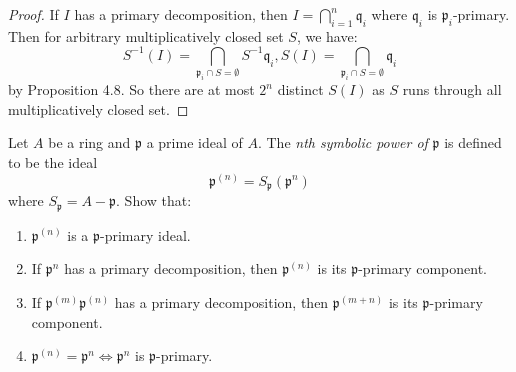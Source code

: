 \documentclass{solution}
\begin{document}
\begin{proof}
    If $I$ has a primary decomposition, then $I = \bigcap\limits_{i = 1}^{n} \mathfrak{q}_i$ where $\mathfrak{q}_i$ is $\mathfrak{p}_i$-primary. Then for arbitrary multiplicatively closed set $S$, we have:
    $$S ^{-1} (I) = \bigcap\limits_{\mathfrak{p}_i \cap S = \emptyset} S ^{-1} \mathfrak{q}_i, S(I) = \bigcap\limits_{\mathfrak{p}_i \cap S = \emptyset} \mathfrak{q}_i$$
    by Proposition 4.8. So there are at most $2^n$ distinct $S(I)$ as $S$ runs through all multiplicatively closed set.
\end{proof}

\begin{problem}
    Let $A$ be a ring and $\mathfrak{p}$ a prime ideal of $A$. The \textit{nth symbolic power of} $\mathfrak{p}$ is defined to be the ideal
    $$\mathfrak{p}^{(n)} = S_{\mathfrak{p}}(\mathfrak{p}^n)$$
    where $S_{\mathfrak{p}} = A - \mathfrak{p}$. Show that:
    \begin{enumerate}
        \item $\mathfrak{p}^{(n)}$ is a $\mathfrak{p}$-primary ideal.
        \item If $\mathfrak{p}^n$ has a primary decomposition, then $\mathfrak{p}^{(n)}$ is its $\mathfrak{p}$-primary component.
        \item If $\mathfrak{p}^{(m)}\mathfrak{p}^{(n)}$ has a primary decomposition, then $\mathfrak{p}^{(m + n)}$ is its $\mathfrak{p}$-primary component.
        \item $\mathfrak{p}^{(n)} = \mathfrak{p}^n \Leftrightarrow \mathfrak{p}^{n}$ is $\mathfrak{p}$-primary.
    \end{enumerate}
\end{problem}
\end{document}
